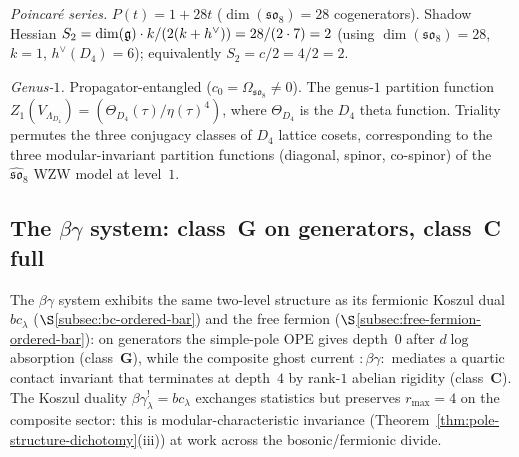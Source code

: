 \begin{computation}
\smallskip
\noindent
\emph{Poincar\'{e} series.}
$P(t) = 1 + 28t$ ($\dim(\mathfrak{so}_8) = 28$ cogenerators).
Shadow Hessian
$S_2 = \dim(\mathfrak{g})\cdot k/(2(k+h^\vee)) = 28/(2 \cdot 7) = 2$
(using $\dim(\mathfrak{so}_8) = 28$, $k = 1$, $h^\vee(D_4) = 6$);
equivalently $S_2 = c/2 = 4/2 = 2$.

\smallskip
\noindent
\emph{Genus-$1$.}
Propagator-entangled ($c_0 = \Omega_{\mathfrak{so}_8} \ne 0$).
The genus-$1$ partition function
$Z_1(V_{\Lambda_{D_4}}) = (\Theta_{D_4}(\tau)/\eta(\tau)^4)$,
where $\Theta_{D_4}$ is the $D_4$ theta function.
Triality permutes the three conjugacy classes of $D_4$
lattice cosets, corresponding to the three modular-invariant
partition functions (diagonal, spinor, co-spinor) of the
$\widehat{\mathfrak{so}}_8$ WZW model at level~$1$.
\end{computation}

\subsection{The $\beta\gamma$ system: class~G on generators, class~C full}%
\label{subsec:betagamma-ordered-bar}%
%

The $\beta\gamma$ system exhibits the same two-level
structure as its fermionic Koszul dual $bc_\lambda$
($\S$\ref{subsec:bc-ordered-bar}) and the free fermion
($\S$\ref{subsec:free-fermion-ordered-bar}): on generators
the simple-pole OPE gives depth~$0$ after $d\log$
absorption (class~$\mathbf{G}$), while the composite
ghost current ${:}\beta\gamma{:}$ mediates a quartic
contact invariant that terminates at depth~$4$ by
rank-$1$ abelian rigidity (class~$\mathbf{C}$).
The Koszul duality $\beta\gamma_\lambda^! = bc_\lambda$
exchanges statistics but preserves $r_{\max} = 4$ on
the composite sector: this is modular-characteristic
invariance (Theorem~\ref{thm:pole-structure-dichotomy}(iii))
at work across the bosonic/fermionic divide.

